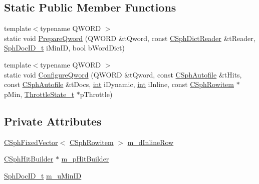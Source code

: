 \subsection*{Static Public Member Functions}
\begin{DoxyCompactItemize}
\item 
{\footnotesize template$<$typename Q\-W\-O\-R\-D $>$ }\\static void \hyperlink{classCSphMerger_ad1c867f57373f6c5e88da747810a7d36}{Prepare\-Qword} (Q\-W\-O\-R\-D \&t\-Qword, const \hyperlink{classCSphDictReader}{C\-Sph\-Dict\-Reader} \&t\-Reader, \hyperlink{sphinx_8h_a3176771631c12a9e4897272003e6b447}{Sph\-Doc\-I\-D\-\_\-t} i\-Min\-I\-D, bool b\-Word\-Dict)
\item 
{\footnotesize template$<$typename Q\-W\-O\-R\-D $>$ }\\static void \hyperlink{classCSphMerger_a2d6995e96c5e9f13a67202916591728a}{Configure\-Qword} (Q\-W\-O\-R\-D \&t\-Qword, const \hyperlink{classCSphAutofile}{C\-Sph\-Autofile} \&t\-Hits, const \hyperlink{classCSphAutofile}{C\-Sph\-Autofile} \&t\-Docs, \hyperlink{sphinxexpr_8cpp_a4a26e8f9cb8b736e0c4cbf4d16de985e}{int} i\-Dynamic, \hyperlink{sphinxexpr_8cpp_a4a26e8f9cb8b736e0c4cbf4d16de985e}{int} i\-Inline, const \hyperlink{sphinx_8h_a6a2df0f05f3397df8b6e230fda6f852f}{C\-Sph\-Rowitem} $\ast$p\-Min, \hyperlink{structThrottleState__t}{Throttle\-State\-\_\-t} $\ast$p\-Throttle)
\end{DoxyCompactItemize}
\subsection*{Private Attributes}
\begin{DoxyCompactItemize}
\item 
\hyperlink{classCSphFixedVector}{C\-Sph\-Fixed\-Vector}$<$ \hyperlink{sphinx_8h_a6a2df0f05f3397df8b6e230fda6f852f}{C\-Sph\-Rowitem} $>$ \hyperlink{classCSphMerger_a38fdfaaaba3f0f52ab25c3e9e385681b}{m\-\_\-d\-Inline\-Row}
\item 
\hyperlink{classCSphHitBuilder}{C\-Sph\-Hit\-Builder} $\ast$ \hyperlink{classCSphMerger_a007c577963e11daa92b018e026c6b755}{m\-\_\-p\-Hit\-Builder}
\item 
\hyperlink{sphinx_8h_a3176771631c12a9e4897272003e6b447}{Sph\-Doc\-I\-D\-\_\-t} \hyperlink{classCSphMerger_a85e280118c793240be1b768f89d27513}{m\-\_\-u\-Min\-I\-D}
\end{DoxyCompactItemize}


